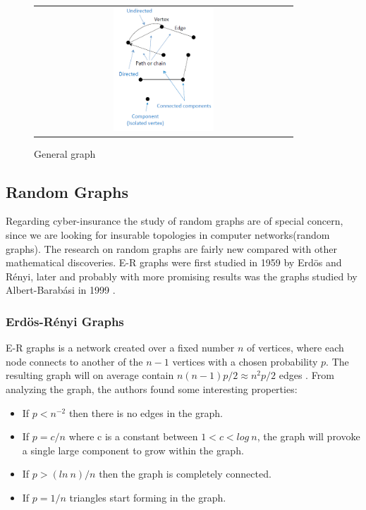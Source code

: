 \begin{figure}
\centering
\begin{tabular}{@{}c@{}}
\includegraphics[width=0.4\textwidth]{../Figures/generalGraph.png}
\end{tabular}
\caption{\label{fig:generalGraph} General graph \cite{audestad}}
\end{figure}


\subsection{Random Graphs}

Regarding cyber-insurance the study of random graphs are of special concern, since we are looking for insurable topologies in computer networks(random graphs). The research on random graphs are fairly new compared with other mathematical discoveries. E-R graphs were first studied in 1959 by Erdös and Rényi, later and probably with more promising results was the graphs studied by Albert-Barabási in 1999 \cite{audestad}. 

\subsubsection{Erdös-Rényi Graphs}
E-R graphs is a network created over a fixed number $n$ of vertices, where each node connects to another of the $n-1$ vertices with a chosen 
probability $p$. The resulting graph will on average contain $n(n-1)p/2 \approx n^{2}p/2$ edges \cite{barabasi}. 
From analyzing the graph, the authors found some interesting properties\cite{barabasi}\cite{audestad}:

\begin{itemize}
\item If $p<n^{-2}$  then there is no edges in the graph. 
\item If $p=c/n$ where c is a constant between $1 < c < log\: n$, the graph will provoke a single large component to grow within the graph.
\item If $p>(ln\: n)/n$ then the graph is completely connected. 
\item If $p = 1/n$ triangles start forming in the graph. 
\end{itemize}

